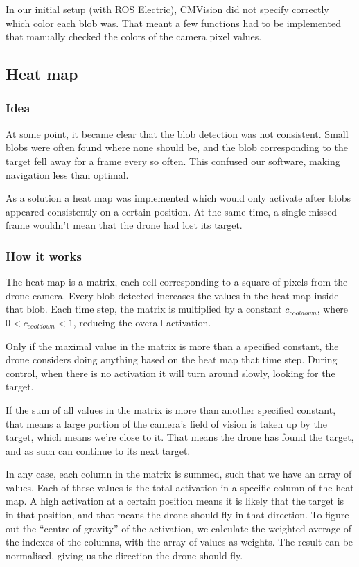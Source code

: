 \documentclass[a4paper,10pt]{article}
\begin{document}
In our initial setup (with ROS Electric), CMVision did not specify correctly
which color each blob was. That meant a few functions had to be implemented that manually checked the colors of the camera pixel values.


\subsection{Heat map}
\subsubsection{Idea}
At some point, it became clear that the blob detection was not consistent.
Small blobs were often found where none should be, and the blob corresponding
to the target fell away for a frame every so often. This confused our software,
making navigation less than optimal.

As a solution a heat map was implemented which
would only activate after blobs appeared consistently on a certain position.
At the same time, a single missed frame wouldn't mean that the drone had lost
its target.
\subsubsection{How it works}\label{subsec:howheatmapworks}
The heat map is a matrix, each cell corresponding to a square of
pixels from the drone camera. Every blob detected increases the
values in the heat map inside that blob. Each time step, the matrix is
multiplied by a constant $c_{{cooldown}}$, where
$0 < c_{{cooldown}} < 1$, reducing the overall
activation.

Only if the maximal value in the matrix is more than a specified constant,
the drone considers doing anything based on the heat map that time step.
During control, when there is no activation it will turn around slowly, looking for the target.

If the sum of all values in the matrix is more than another specified constant,
that means a large portion of the camera's field of vision is taken up
by the target, which means we're close to it. That means the drone has
found the target, and as such can continue to its next target.

In any case, each column in the matrix is summed, such that we have an
array of values. Each of these values is the total activation in a specific
column of the heat map. A high activation at a certain position means it is
likely that the target is in that position, and that means the drone should
fly in that direction. To figure out the ``centre of gravity'' of the
activation, we calculate the weighted average of the indexes of the columns,
with the array of values as weights. The result can be normalised, giving us
the direction the drone should fly.
\end{document}
